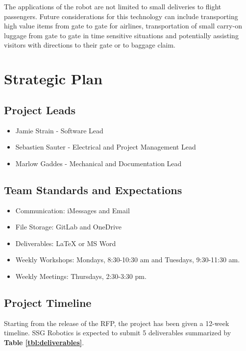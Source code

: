 \documentclass[letterpaper,fleqn,oneside]{template}
\begin{document}
The applications of the robot are not limited to small deliveries to flight passengers. Future considerations for this technology can include transporting high value items from gate to gate for airlines, transportation of small carry-on luggage from gate to gate in time sensitive situations and potentially assisting visitors with directions to their gate or to baggage claim.

\section{Strategic Plan}


\subsection{Project Leads}
\begin{itemize}
    \item Jamie Strain - Software Lead
    \item Sebastien Sauter - Electrical and Project Management Lead
    \item Marlow Gaddes - Mechanical and Documentation Lead
\end{itemize}
\subsection{Team Standards and Expectations}
\begin{itemize}
    \item Communication: iMessages and Email
    \item File Storage: GitLab and OneDrive
    \item Deliverables: LaTeX or MS Word
    \item Weekly Workshops: Mondays, 8:30-10:30 am and Tuesdays, 9:30-11:30 am.
    \item Weekly Meetings: Thursdays, 2:30-3:30 pm. 
\end{itemize}



\subsection{Project Timeline}

Starting from the release of the RFP, the project has been given a 12-week timeline. SSG Robotics is expected to submit 5 deliverables summarized by \textbf{Table \ref{tbl:deliverables}}.
\end{document}
